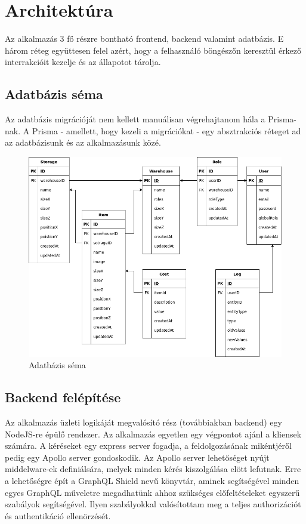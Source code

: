 \chapter{Architektúra}
Az alkalmazás 3 fő részre bontható frontend, backend valamint adatbázis.
E három réteg együttesen felel azért, hogy a felhasználó böngészőn keresztül érkező interrakcióit kezelje és az állapotot tárolja.

\section{Adatbázis séma}
Az adatbázis migrációját nem kellett manuálisan végrehajtanom hála a Prisma-nak. 
A Prisma - amellett, hogy kezeli a migrációkat - egy absztrakciós réteget ad az adatbázisunk és az alkalmazásunk közé.

\begin{figure}[!ht]
  \centering
  \includegraphics[width=150mm, keepaspectratio]{figures/db.png}
  \caption{Adatbázis séma}
  \label{fig:backend}
\end{figure}


\section{Backend felépítése}
Az alkalmazás üzleti logikáját megvalósító rész (továbbiakban backend) egy NodeJS-re épülő rendszer.
Az alkalmazás egyetlen egy végpontot ajánl a kliensek számára.
A kéréseket egy express server fogadja, a feldolgozásának mikéntjéről pedig egy Apollo server gondoskodik.
Az Apollo server lehetőséget nyújt middelware-ek definiálsára, melyek minden kérés kiszolgálása elött lefutnak.
Erre a lehetőségre épít a GraphQL Shield nevű könyvtár, aminek segítségével minden egyes GraphQL műveletre megadhatünk ahhoz szükséges előfeltételeket egyszerű szabályok segítségével.
Ilyen szabályokkal valósítottam meg a teljes authorizációt és authentikáció ellenörzését.

